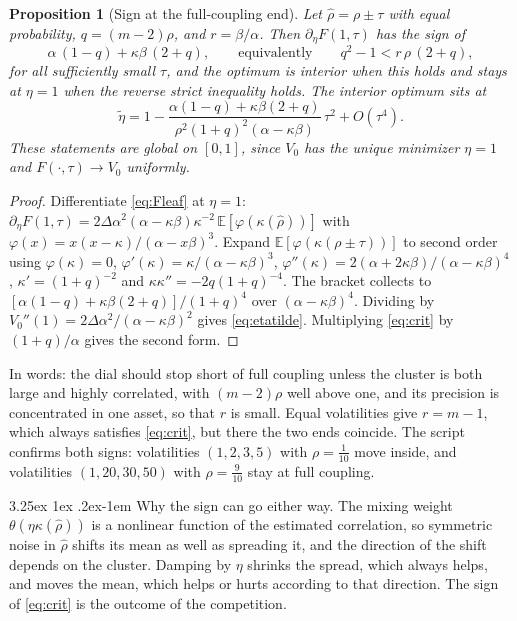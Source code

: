 \documentclass[11pt]{article}
\makeatletter
\renewcommand\paragraph{\@startsection{paragraph}{4}{\z@}%
  {3.25ex \@plus1ex \@minus.2ex}{-1em}%
  {\normalfont\normalsize\itshape}}
\newtheorem{proposition}{Proposition}
\makeatother
\begin{document}
\begin{proposition}[Sign at the full-coupling end]
\label{prop:sign}
Let $\widehat\rho=\rho\pm\tau$ with equal probability, $q=(m-2)\rho$, and
$r=\beta/\alpha$. Then $\partial_\eta F(1,\tau)$ has the sign of
\begin{equation}
  \alpha\,(1-q)+\kappa\beta\,(2+q),
  \qquad\text{equivalently}\qquad
  q^2-1<r\,\rho\,(2+q),
  \label{eq:crit}
\end{equation}
for all sufficiently small $\tau$, and the optimum is interior when this
holds and stays at $\eta=1$ when the reverse strict inequality holds. The
interior optimum sits at
\begin{equation}
  \tilde\eta=1-\frac{\alpha(1-q)+\kappa\beta(2+q)}{\rho^2(1+q)^2(\alpha-\kappa\beta)}\,\tau^2+O(\tau^4).
  \label{eq:etatilde}
\end{equation}
These statements are global on $[0,1]$, since $V_0$ has the unique
minimizer $\eta=1$ and $F(\cdot,\tau)\to V_0$ uniformly.
\end{proposition}

\begin{proof}
Differentiate \eqref{eq:Fleaf} at $\eta=1$:
$\partial_\eta F(1,\tau)=2\Delta\alpha^2(\alpha-\kappa\beta)\kappa^{-2}\,
\mathbb{E}[\varphi(\kappa(\widehat\rho))]$ with
$\varphi(x)=x(x-\kappa)/(\alpha-x\beta)^3$. Expand
$\mathbb{E}[\varphi(\kappa(\rho\pm\tau))]$ to second order using
$\varphi(\kappa)=0$, $\varphi'(\kappa)=\kappa/(\alpha-\kappa\beta)^3$,
$\varphi''(\kappa)=2(\alpha+2\kappa\beta)/(\alpha-\kappa\beta)^4$,
$\kappa'=(1+q)^{-2}$ and $\kappa\kappa''=-2q(1+q)^{-4}$. The bracket
collects to $[\alpha(1-q)+\kappa\beta(2+q)]/(1+q)^4$ over
$(\alpha-\kappa\beta)^4$. Dividing by $V_0''(1)=2\Delta\alpha^2/(\alpha-\kappa\beta)^2$
gives \eqref{eq:etatilde}. Multiplying \eqref{eq:crit} by
$(1+q)/\alpha$ gives the second form.
\end{proof}

In words: the dial should stop short of full coupling unless the cluster is
both large and highly correlated, with $(m-2)\rho$ well above one, and its
precision is concentrated in one asset, so that $r$ is small. Equal
volatilities give $r=m-1$, which always satisfies \eqref{eq:crit}, but there
the two ends coincide. The script confirms both signs: volatilities
$(1,2,3,5)$ with $\rho=\tfrac1{10}$ move inside, and volatilities
$(1,20,30,50)$ with $\rho=\tfrac9{10}$ stay at full coupling.

\paragraph{Why the sign can go either way.} The mixing weight
$\theta(\eta\kappa(\widehat\rho))$ is a nonlinear function of the estimated
correlation, so symmetric noise in $\widehat\rho$ shifts its mean as well as
spreading it, and the direction of the shift depends on the cluster.
Damping by $\eta$ shrinks the spread, which always helps, and moves the
mean, which helps or hurts according to that direction. The sign of
\eqref{eq:crit} is the outcome of the competition.
\end{document}
